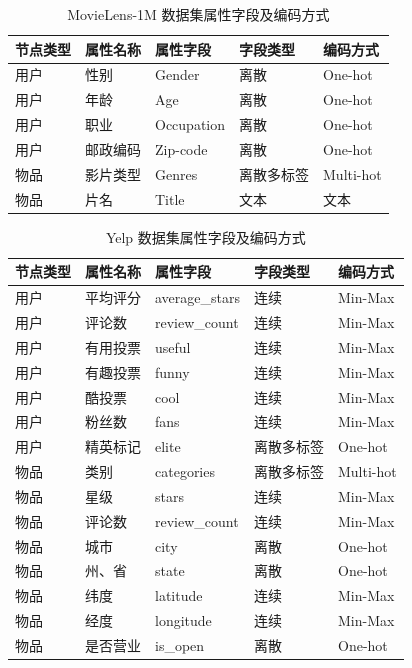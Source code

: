 \begin{table}[H]
    \centering
    \caption{MovieLens-1M 数据集属性字段及编码方式}
    \label{tab:dataset_attr_ml}
    \begin{tabular}{lllll}
        \toprule
        节点类型 & 属性名称 & 属性字段 & 字段类型 & 编码方式 \\
        \midrule
        用户 & 性别 & Gender & 离散 & One-hot \\
        用户 & 年龄 & Age & 离散 & One-hot \\
        用户 & 职业 & Occupation & 离散 & One-hot \\
        用户 & 邮政编码 & Zip-code & 离散 & One-hot \\
        物品 & 影片类型 & Genres & 离散多标签 & Multi-hot \\
        物品 & 片名 & Title & 文本 & 文本 \\
        \bottomrule
    \end{tabular}
\end{table}

\begin{table}[H]
    \centering
    \caption{Yelp 数据集属性字段及编码方式}
    \label{tab:dataset_attr_yelp}
    \begin{tabular}{lllll}
        \toprule
        节点类型 & 属性名称 & 属性字段 & 字段类型 & 编码方式 \\
        \midrule
        用户 & 平均评分 & average\_stars & 连续 & Min-Max \\
        用户 & 评论数 & review\_count & 连续 & Min-Max \\
        用户 & 有用投票 & useful & 连续 & Min-Max \\
        用户 & 有趣投票 & funny & 连续 & Min-Max \\
        用户 & 酷投票 & cool & 连续 & Min-Max \\
        用户 & 粉丝数 & fans & 连续 & Min-Max \\
        用户 & 精英标记 & elite & 离散多标签 & One-hot \\
        物品 & 类别 & categories & 离散多标签 & Multi-hot \\
        物品 & 星级 & stars & 连续 & Min-Max \\
        物品 & 评论数 & review\_count & 连续 & Min-Max \\
        物品 & 城市 & city & 离散 & One-hot \\
        物品 & 州、省 & state & 离散 & One-hot \\
        物品 & 纬度 & latitude & 连续 & Min-Max \\
        物品 & 经度 & longitude & 连续 & Min-Max \\
        物品 & 是否营业 & is\_open & 离散 & One-hot \\
        \bottomrule
    \end{tabular}
\end{table}

